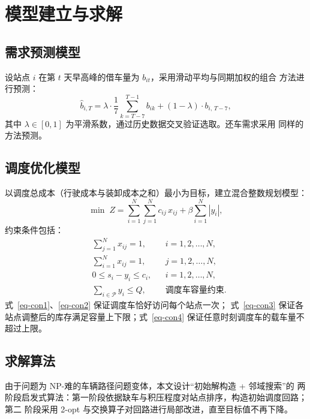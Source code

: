 \documentclass[zihao=-4,a4paper]{ctexart}
\begin{document}
\section{模型建立与求解}

\subsection{需求预测模型}

\quad 设站点 $i$ 在第 $t$ 天早高峰的借车量为 $b_{it}$，采用滑动平均与同期加权的组合
方法进行预测：
\begin{equation}
  \hat{b}_{i,T} = \lambda \cdot \frac{1}{7} \sum_{k=T-7}^{T-1} b_{ik}
    + (1 - \lambda) \cdot b_{i,\,T-7},
  \label{eq-forecast}
\end{equation}
其中 $\lambda \in [0, 1]$ 为平滑系数，通过历史数据交叉验证选取。还车需求采用
同样的方法预测。

\subsection{调度优化模型}

\quad 以调度总成本（行驶成本与装卸成本之和）最小为目标，建立混合整数规划模型：
\begin{equation}
  \min \; Z = \sum_{i=1}^{N} \sum_{j=1}^{N} c_{ij}\, x_{ij}
    + \beta \sum_{i=1}^{N} |y_i|,
  \label{eq-objective}
\end{equation}
约束条件包括：
\begin{align}
  & \sum_{j=1}^{N} x_{ij} = 1, && i = 1, 2, \ldots, N, \label{eq-con1}\\
  & \sum_{i=1}^{N} x_{ij} = 1, && j = 1, 2, \ldots, N, \label{eq-con2}\\
  & 0 \leq s_i - y_i \leq c_i, && i = 1, 2, \ldots, N, \label{eq-con3}\\
  & \sum_{i \in \mathcal{P}} y_i \leq Q, && \text{调度车容量约束}. \label{eq-con4}
\end{align}
式~\eqref{eq-con1}、\eqref{eq-con2} 保证调度车恰好访问每个站点一次；
式~\eqref{eq-con3} 保证各站点调整后的库存满足容量上下限；式~\eqref{eq-con4}
保证任意时刻调度车的载车量不超过上限。

\subsection{求解算法}

\quad 由于问题为 NP-难的车辆路径问题变体，本文设计“初始解构造 + 邻域搜索”的
两阶段启发式算法：第一阶段依据缺车与积压程度对站点排序，构造初始调度回路；第二
阶段采用 2-opt 与交换算子对回路进行局部改进，直至目标值不再下降。
\end{document}
